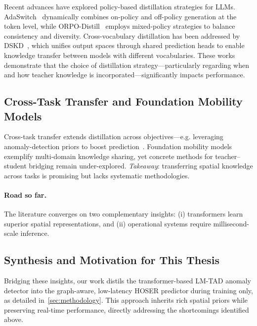 Recent advances have explored policy-based distillation strategies for LLMs. AdaSwitch~\cite{pengAdaSwitchAdaptiveSwitching2025} dynamically combines on-policy and off-policy generation at the token level, while ORPO-Distill~\cite{singhORPODistillMixedPolicyPreference2025} employs mixed-policy strategies to balance consistency and diversity. Cross-vocabulary distillation has been addressed by DSKD~\cite{zhangDualSpaceFrameworkGeneral2025}, which unifies output spaces through shared prediction heads to enable knowledge transfer between models with different vocabularies. These works demonstrate that the choice of distillation strategy—particularly regarding when and how teacher knowledge is incorporated—significantly impacts performance.

\subsection{Cross-Task Transfer and Foundation Mobility Models}
\label{sec:lit-transfer}
Cross-task transfer extends distillation across objectives—e.g.
leveraging anomaly-detection priors to boost prediction~\cite{maLearningUniversalHuman2025}.  Foundation mobility models exemplify multi-domain knowledge sharing, yet concrete methods for teacher–student bridging remain under-explored.  \textit{Takeaway}: transferring spatial knowledge across tasks is promising but lacks systematic methodologies.

\paragraph{Road so far.}  The literature converges on two complementary insights: (i) transformers learn superior spatial representations, and (ii) operational systems require millisecond-scale inference.

\subsection*{Synthesis and Motivation for This Thesis}
\label{sec:lit-synthesis}
Bridging these insights, our work distils the transformer-based LM-TAD anomaly detector into the graph-aware, low-latency HOSER predictor during training only, as detailed in~\autoref{sec:methodology}. This approach inherits rich spatial priors while preserving real-time performance, directly addressing the shortcomings identified above.

